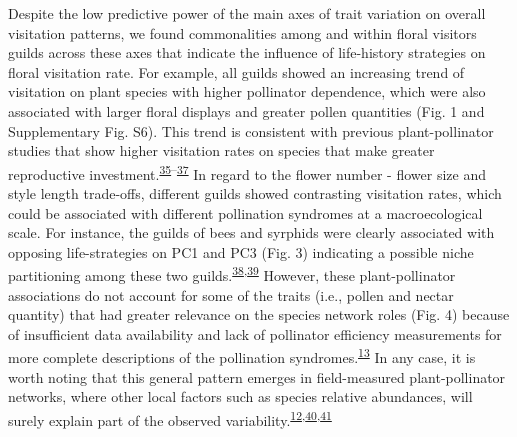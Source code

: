 \documentclass[
  12pt,
  a4paper,
]{article}
\begin{document}
Despite the low predictive power of the main axes of trait variation on overall visitation patterns, we found commonalities among and within floral visitors guilds across these axes that indicate the influence of life-history strategies on floral visitation rate. For example, all guilds showed an increasing trend of visitation on plant species with higher pollinator dependence, which were also associated with larger floral displays and greater pollen quantities (Fig. 1 and Supplementary Fig. S6). This trend is consistent with previous plant-pollinator studies that show higher visitation rates on species that make greater reproductive investment.\textsuperscript{\protect\hyperlink{ref-hegland2005}{35}--\protect\hyperlink{ref-kaiser2014}{37}} In regard to the flower number - flower size and style length trade-offs, different guilds showed contrasting visitation rates, which could be associated with different pollination syndromes at a macroecological scale. For instance, the guilds of bees and syrphids were clearly associated with opposing life-strategies on PC1 and PC3 (Fig. 3) indicating a possible niche partitioning among these two guilds.\textsuperscript{\protect\hyperlink{ref-palmer2003}{38},\protect\hyperlink{ref-phillips2020}{39}} However, these plant-pollinator associations do not account for some of the traits (i.e., pollen and nectar quantity) that had greater relevance on the species network roles (Fig. 4) because of insufficient data availability and lack of pollinator efficiency measurements for more complete descriptions of the pollination syndromes.\textsuperscript{\protect\hyperlink{ref-dellinger2020}{13}} In any case, it is worth noting that this general pattern emerges in field-measured plant-pollinator networks, where other local factors such as species relative abundances, will surely explain part of the observed variability.\textsuperscript{\protect\hyperlink{ref-bartomeus2016}{12},\protect\hyperlink{ref-vazquez2007}{40},\protect\hyperlink{ref-encinas2012}{41}}
\end{document}
